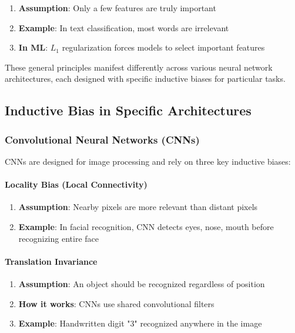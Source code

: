 \begin{enumerate}
\item \textbf{Assumption}: Only a few features are truly important
\item \textbf{Example}: In text classification, most words are irrelevant
\item \textbf{In ML}: $L_1$ regularization forces models to select important features
\end{enumerate}

These general principles manifest differently across various neural network architectures, each designed with specific inductive biases for particular tasks.

\subsection{Inductive Bias in Specific Architectures}
\label{subsec:inductive-bias-architectures}

\subsubsection{Convolutional Neural Networks (CNNs)}
\label{subsubsec:cnn-inductive-bias}

CNNs are designed for image processing and rely on three key inductive biases:

\paragraph{Locality Bias (Local Connectivity)}
\label{para:locality-bias}

\begin{enumerate}
\item \textbf{Assumption}: Nearby pixels are more relevant than distant pixels
\item \textbf{Example}: In facial recognition, CNN detects eyes, nose, mouth before recognizing entire face
\end{enumerate}

\paragraph{Translation Invariance}
\label{para:translation-invariance}

\begin{enumerate}
\item \textbf{Assumption}: An object should be recognized regardless of position
\item \textbf{How it works}: CNNs use shared convolutional filters
\item \textbf{Example}: Handwritten digit "3" recognized anywhere in the image
\end{enumerate}

